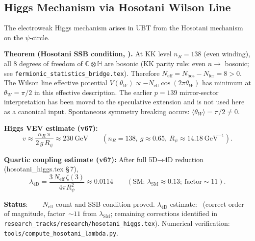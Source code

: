 \subsection{Higgs Mechanism via Hosotani Wilson Line}
\label{sec:hosotani_higgs}

The electroweak Higgs mechanism arises in UBT from the Hosotani mechanism
on the $\psi$-circle.

\medskip
\noindent\textbf{Theorem (Hosotani SSB condition, \Lone).}\quad
At KK level $n_R = 138$ (even winding), all 8 degrees of freedom
of $\mathbb{C}\otimes\mathbb{H}$ are bosonic (KK parity rule:
even $n \to$ bosonic; see \texttt{fermionic\_statistics\_bridge.tex}).
Therefore $N_{\mathrm{eff}} = N_{\mathrm{bos}} - N_{\mathrm{fer}} = 8 > 0$.
The Wilson line effective potential $V(\theta_W) \propto -N_{\mathrm{eff}}
\cos(2\pi\theta_W)$ has minimum at $\theta_W = \pi/2$ in this effective description.
The earlier $p=139$ mirror-sector interpretation has been moved to the
speculative extension and is not used here as a canonical input.
Spontaneous symmetry breaking occurs: $\langle\theta_W\rangle = \pi/2 \neq 0$.

\medskip
\noindent\textbf{Higgs VEV estimate (v67):}
\begin{equation}
  v \approx \frac{n_R\,\pi}{2\,g\,R_\psi} \approx 230~\text{GeV}
  \qquad (n_R = 138,\ g \approx 0.65,\ R_\psi \approx 14.18~\text{GeV}^{-1}).
\end{equation}

\noindent\textbf{Quartic coupling estimate (v67):}
After full 5D→4D reduction (hosotani\_higgs.tex §\,7),
\begin{equation}
  \lambda_{\text{4D}}
  = \frac{3\,N_{\mathrm{eff}}\,\zeta(3)}{4\pi R_\psi^2}
  \approx 0.0114
  \qquad (\text{SM: } \lambda_{\text{SM}} \approx 0.13;\ \text{factor} \sim 11).
\end{equation}

\noindent\textbf{Status}: \Lone\ — $N_{\mathrm{eff}}$ count and SSB condition proved.
$\lambda_{\mathrm{4D}}$ estimate: \Lone\ (correct order of magnitude, factor~$\sim 11$
from $\lambda_{\mathrm{SM}}$; remaining corrections identified in
\texttt{research\_tracks/research/hosotani\_higgs.tex}).
Numerical verification: \texttt{tools/compute\_hosotani\_lambda.py}.
